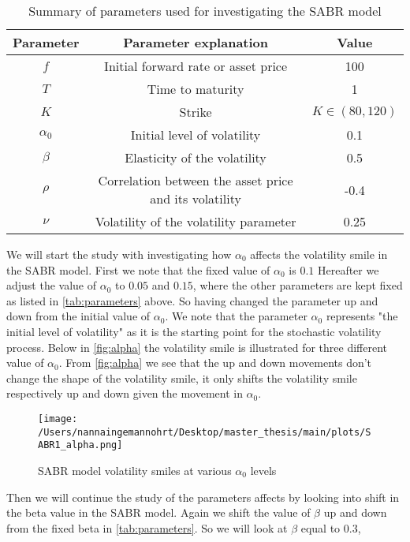 \begin{table}[H]
    \centering
    \begin{tabular}{ccc}
      \toprule
      \textbf{Parameter} & \textbf{Parameter explanation} & \textbf{Value} \\
      \midrule
      $f$ & Initial forward rate or asset price & 100 \\
      $T$ & Time to maturity & 1 \\
      $K$ & Strike & $K \in (80,120)$ \\
      $\alpha_0$ & Initial level of volatility & 0.1 \\
      $\beta$ & Elasticity of the volatility & 0.5 \\
      $\rho$ & Correlation between the asset price and its volatility & -0.4 \\
      $\nu$ & Volatility of the volatility parameter & 0.25 \\
      \bottomrule
    \end{tabular}
    \caption{Summary of parameters used for investigating the SABR model}
    \label{tab:parameters}
\end{table}
\noindent
We will start the study with investigating how $\alpha_0$ affects the volatility smile in the SABR model. 
First we note that the fixed value of $\alpha_0$ is $0.1$ Hereafter we adjust the value of $\alpha_0$ to $0.05$ and $0.15$,
where the other parameters are kept fixed as listed in \autoref{tab:parameters} above. So having changed the parameter
up and down from the initial value of $\alpha_0$.
We note that the parameter $\alpha_0$
represents "the initial level of volatility" as it is the starting point for the stochastic volatility process. 
Below in \autoref{fig:alpha} the volatility smile is illustrated for three different value of $\alpha_0$. 
From \autoref{fig:alpha} we see that the up and down movements don't change the shape of the volatility smile, 
it only shifts the volatility smile respectively up and down given the movement in $\alpha_0$.
\begin{figure}[H]
    \centering
    \texttt{[image: /Users/nannaingemannohrt/Desktop/master\_thesis/main/plots/SABR1\_alpha.png]}
    \caption{SABR model volatility smiles at various $\alpha_0$ levels}
    \label{fig:alpha}
\end{figure}
\noindent
Then we will continue the study of the parameters affects by looking into shift in the beta value in the SABR model.
Again we shift the value of $\beta$ up and down from the fixed beta in \autoref{tab:parameters}. So we will look at $\beta$ equal to $0.3$,

